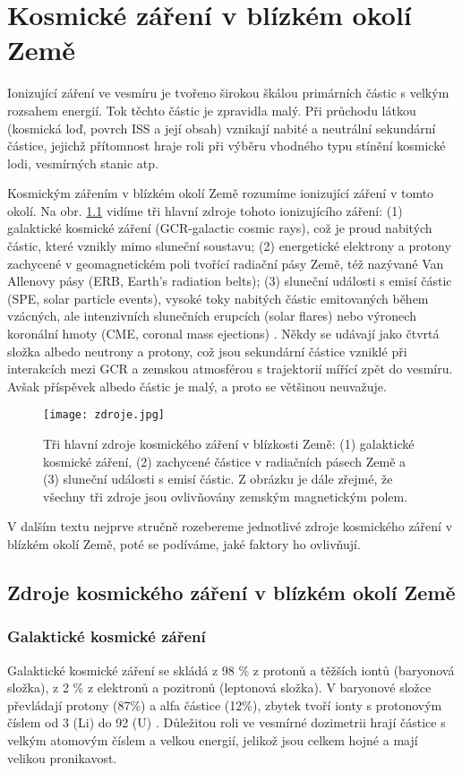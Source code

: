 \chapter{Kosmické záření v blízkém okolí Země}
Ionizující záření ve vesmíru je tvořeno širokou škálou primárních částic s velkým rozsahem energií. Tok těchto částic je zpravidla malý. Při průchodu látkou (kosmická loď, povrch ISS a její obsah) vznikají nabité a neutrální sekundární částice, jejichž přítomnost hraje roli při výběru vhodného typu stínění kosmické lodi, vesmírných stanic atp.   

Kosmickým zářením v blízkém okolí Země rozumíme ionizující záření v tomto okolí. Na obr. \ref{fig:zdroje} vidíme tři hlavní zdroje tohoto ionizujícího záření: (1) galaktické kosmické záření (GCR-galactic cosmic rays), což je proud nabitých částic, které vznikly mimo sluneční soustavu; (2) energetické elektrony a protony zachycené v geomagnetickém poli tvořící radiační pásy Země, též nazývané Van Allenovy pásy (ERB, Earth's radiation belts); (3) sluneční události s emisí částic (SPE, solar particle events), vysoké toky nabitých částic emitovaných během vzácných, ale intenzivních slunečních erupcích (solar flares) nebo výronech koronální hmoty (CME, coronal mass ejections) \cite{benton}. Někdy se udávají jako čtvrtá složka albedo neutrony a protony, což jsou sekundární částice
vzniklé při interakcích mezi GCR a zemskou atmosférou s trajektorií mířící zpět do vesmíru. Avšak příspěvek albedo částic je malý, a proto se většinou neuvažuje.

\begin{figure}[ht]
  \centering
  \texttt{[image: zdroje.jpg]}
  \caption{Tři hlavní zdroje kosmického záření v blízkosti Země: (1) galaktické kosmické záření, (2) zachycené částice v radiačních pásech Země a (3) sluneční události s emisí částic. Z obrázku je dále zřejmé, že všechny tři zdroje jsou ovlivňovány zemským magnetickým polem. \cite{benton}}
  \label{fig:zdroje}
\end{figure}

V dalším textu nejprve stručně rozebereme jednotlivé zdroje kosmického záření v blízkém okolí Země, poté se podíváme, jaké faktory ho ovlivňují.
\section{Zdroje kosmického záření v blízkém okolí Země}
\subsection{Galaktické kosmické záření}
Galaktické kosmické záření se skládá z 98 \% z protonů a těžších iontů (baryonová složka), z 2 \% z elektronů a pozitronů (leptonová složka). V baryonové složce převládají protony (87\%) a alfa částice (12\%), zbytek tvoří ionty s protonovým číslem od 3 (Li) do 92 (U) \cite{benton}. Důležitou roli ve vesmírné dozimetrii hrají částice s velkým atomovým číslem a velkou energií, jelikož jsou celkem hojné a mají velikou pronikavost.

